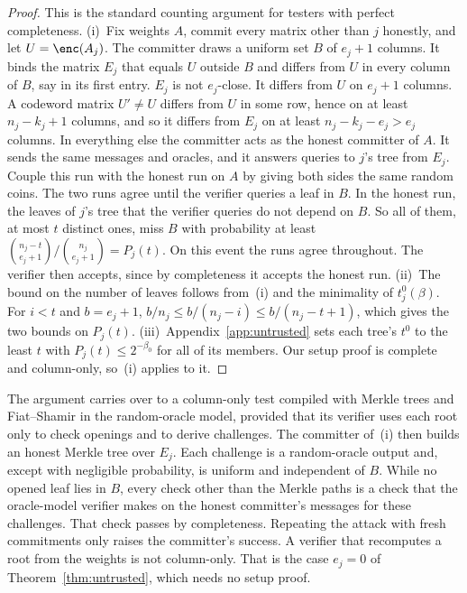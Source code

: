 \begin{proof}
This is the standard counting argument for testers with perfect completeness.
(i)~Fix weights $A$, commit every matrix other than $j$ honestly, and let $U=\enc(A_j)$. The
committer draws a uniform set $B$ of $e_j+1$ columns. It binds the matrix $E_j$ that equals $U$
outside $B$ and differs from $U$ in every column of $B$, say in its first entry. $E_j$ is not
$e_j$-close. It differs from $U$ on $e_j+1$ columns. A codeword matrix $U'\neq U$ differs from $U$
in some row, hence on at least $n_j-k_j+1$ columns, and so it differs from $E_j$ on at least
$n_j-k_j-e_j>e_j$ columns. In everything else the committer acts as the honest committer of $A$. It
sends the same messages and oracles, and it answers queries to $j$'s tree from $E_j$. Couple this
run with the honest run on $A$ by giving both sides the same random coins. The two runs agree until
the verifier queries a leaf in $B$. In the honest run, the leaves of $j$'s tree that the verifier
queries do not depend on $B$. So all of them, at most $t$ distinct ones, miss $B$ with probability
at least $\binom{n_j-t}{e_j+1}\big/\binom{n_j}{e_j+1}=P_j(t)$. On this event the runs agree
throughout. The verifier then accepts, since by completeness it accepts the honest run.
(ii)~The bound on the number of leaves follows from~(i) and the minimality of $t^0_j(\beta)$. For
$i<t$ and $b=e_j+1$, $b/n_j\le b/(n_j-i)\le b/(n_j-t+1)$, which gives the two bounds on $P_j(t)$.
(iii)~Appendix~\ref{app:untrusted} sets each tree's $t^0$ to the least $t$ with
$P_j(t)\le2^{-\beta_0}$ for all of its members. Our setup proof is complete and column-only, so~(i)
applies to it.
\end{proof}

 The argument carries over to a column-only test compiled with
Merkle trees and Fiat--Shamir in the random-oracle model, provided that its verifier uses each root
only to check openings and to derive challenges. The committer of~(i) then builds an honest Merkle
tree over $E_j$. Each challenge is a random-oracle output and, except with negligible probability,
is uniform and independent of $B$. While no opened leaf lies in $B$, every check other than the
Merkle paths is a check that the oracle-model verifier makes on the honest committer's messages for
these challenges. That check passes by completeness. Repeating the attack with fresh commitments
only raises the committer's success. A verifier that recomputes a root from the weights is not
column-only. That is the case $e_j=0$ of Theorem~\ref{thm:untrusted}, which needs no setup proof.


